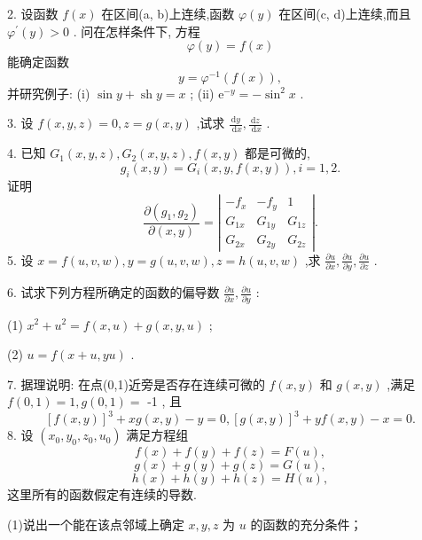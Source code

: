 2. 设函数 \(f\left( x\right)\) 在区间(a, b)上连续,函数 \(\varphi \left( y\right)\) 在区间(c, d)上连续,而且 \({\varphi }^{\prime }\left( y\right)  > 0\) . 问在怎样条件下, 方程
\[
\varphi \left( y\right)  = f\left( x\right)
\]
能确定函数
\[
y = {\varphi }^{-1}\left( {f\left( x\right) }\right) ,
\]
并研究例子: (i) \(\sin y + \operatorname{sh}y = x\) ; (ii) \({\mathrm{e}}^{-y} =  - {\sin }^{2}x\) .

3. 设 \(f\left( {x,y,z}\right)  = 0,z = g\left( {x,y}\right)\) ,试求 \(\frac{\mathrm{d}y}{\mathrm{\;d}x},\frac{\mathrm{d}z}{\mathrm{\;d}x}\) .

4. 已知 \({G}_{1}\left( {x,y,z}\right) ,{G}_{2}\left( {x,y,z}\right) ,f\left( {x,y}\right)\) 都是可微的,
\[
{g}_{i}\left( {x,y}\right)  = {G}_{i}\left( {x,y,f\left( {x,y}\right) }\right) ,i = 1,2.
\]
证明
\[
\frac{\partial \left( {{g}_{1},{g}_{2}}\right) }{\partial \left( {x,y}\right) } = \left| \begin{matrix}  - {f}_{x} &  - {f}_{y} & 1 \\  {G}_{1x} & {G}_{1y} & {G}_{1z} \\  {G}_{2x} & {G}_{2y} & {G}_{2z} \end{matrix}\right| .
\]
5. 设 \(x = f\left( {u,v,w}\right) ,y = g\left( {u,v,w}\right) ,z = h\left( {u,v,w}\right)\) ,求 \(\frac{\partial u}{\partial x},\frac{\partial u}{\partial y},\frac{\partial u}{\partial z}\) .

6. 试求下列方程所确定的函数的偏导数 \(\frac{\partial u}{\partial x},\frac{\partial u}{\partial y}\) :

(1) \({x}^{2} + {u}^{2} = f\left( {x,u}\right)  + g\left( {x,y,u}\right)\) ;

(2) \(u = f\left( {x + u,{yu}}\right)\) .

7. 据理说明: 在点(0,1)近旁是否存在连续可微的 \(f\left( {x,y}\right)\) 和 \(g\left( {x,y}\right)\) ,满足 \(f\left( {0,1}\right)  = 1,g\left( {0,1}\right)  =\) -1 , 且
\[
{\left\lbrack  f\left( x,y\right) \right\rbrack  }^{3} + {xg}\left( {x,y}\right)  - y = 0,{\left\lbrack  g\left( x,y\right) \right\rbrack  }^{3} + {yf}\left( {x,y}\right)  - x = 0.
\]
8. 设 \(\left( {{x}_{0},{y}_{0},{z}_{0},{u}_{0}}\right)\) 满足方程组
\[
f\left( x\right)  + f\left( y\right)  + f\left( z\right)  = F\left( u\right) ,
\]
\[
g\left( x\right)  + g\left( y\right)  + g\left( z\right)  = G\left( u\right) ,
\]
\[
h\left( x\right)  + h\left( y\right)  + h\left( z\right)  = H\left( u\right) ,
\]
这里所有的函数假定有连续的导数.

(1)说出一个能在该点邻域上确定 \(x,y,z\) 为 \(u\) 的函数的充分条件；

